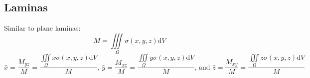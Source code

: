 \subsection{Laminas}
\noindent
Similar to plane laminas:
\begin{equation*}
	M = \iiint\limits_{\Omega}{\sigma(x,y,z)\mathrm{d}V}
\end{equation*}
\begin{equation*}
	\bar{x} = \frac{M_{yz}}{M} = \frac{\iiint\limits_{\Omega}{x\sigma(x,y,z)\mathrm{d}V}}{M} \text{, } \bar{y} = \frac{M_{xz}}{M} = \frac{\iiint\limits_{\Omega}{y\sigma(x,y,z)\mathrm{d}V}}{M} \text{, and } \bar{z} = \frac{M_{xy}}{M} = \frac{\iiint\limits_{\Omega}{z\sigma(x,y,z)\mathrm{d}V}}{M}
\end{equation*}
